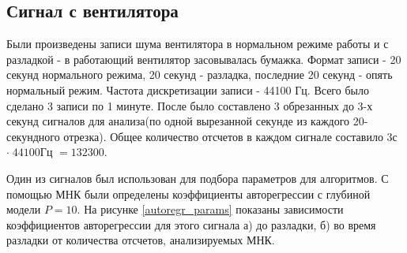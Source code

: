 \documentclass[12pt,a4paper]{article}
\begin{document}
\subsection{Сигнал с вентилятора}

Были произведены записи шума вентилятора в нормальном режиме работы и с разладкой - в работающий вентилятор засовывалась бумажка. Формат записи - 20 секунд нормального режима, 20 секунд - разладка, последние 20 секунд - опять нормальный режим. Частота дискретизации записи - 44100 Гц. Всего было сделано 3 записи по 1 минуте.
После было составлено 3 обрезанных до 3-х секунд сигналов для анализа(по одной вырезанной секунде из каждого 20-секундного отрезка). Общее количество отсчетов в каждом сигнале составило $3$с $\cdot\;44100$Гц $ = 132300.$

Один из сигналов был использован для подбора параметров для алгоритмов. С помощью МНК были определены коэффициенты авторегрессии с глубиной модели $P = 10$. На рисунке \ref{autoregr_params} показаны зависимости коэффициентов авторегрессии для этого сигнала а) до разладки, б) во время разладки от количества отсчетов, анализируемых МНК.
\end{document}
